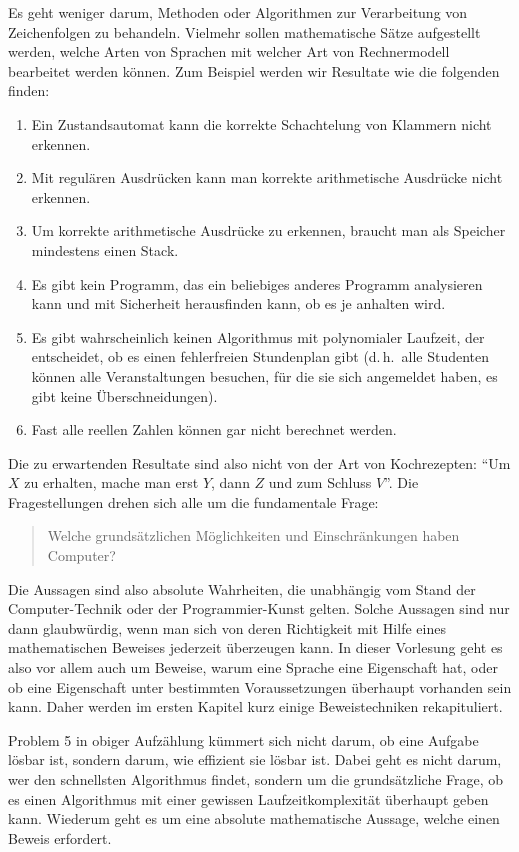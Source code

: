 Es geht weniger darum, Methoden oder Algorithmen zur Verarbeitung
von Zeichenfolgen zu behandeln.
Vielmehr sollen mathematische Sätze aufgestellt werden, welche
Arten von Sprachen mit welcher Art von Rechnermodell bearbeitet
werden können.
Zum Beispiel werden wir Resultate wie die folgenden finden:
\begin{enumerate}
\item Ein Zustandsautomat kann die korrekte Schachtelung von
Klammern nicht erkennen.
\item Mit regulären Ausdrücken kann man korrekte arithmetische
Ausdrücke nicht erkennen.
\item Um korrekte arithmetische Ausdrücke zu erkennen, braucht man als
Speicher mindestens einen Stack.
\item Es gibt kein Programm, das ein beliebiges anderes Programm
analysieren kann und mit Sicherheit herausfinden kann, ob es je anhalten
wird.
\item Es gibt wahrscheinlich keinen Algorithmus mit polynomialer Laufzeit,
der entscheidet, ob es einen fehlerfreien Stundenplan gibt (d.\,h.~alle 
Studenten können alle Veranstaltungen besuchen, für die sie sich
angemeldet haben, es gibt keine Überschneidungen).
\item Fast alle reellen Zahlen können gar nicht berechnet werden.
\end{enumerate}
Die zu erwartenden Resultate sind also nicht von der Art von Kochrezepten:
``Um $X$ zu erhalten, mache man erst $Y$, dann $Z$ und zum Schluss $V$''.
Die Fragestellungen drehen sich alle um die fundamentale Frage:
\begin{quote}
Welche grundsätzlichen Möglichkeiten und Einschränkungen haben
Computer?
\end{quote}
Die Aussagen sind also absolute Wahrheiten, die unabhängig vom Stand
der Com\-pu\-ter-Technik oder der Programmier-Kunst gelten.
Solche Aussagen sind nur dann glaub\-würdig, wenn man sich von deren
Richtigkeit mit Hilfe eines mathematischen Beweises jederzeit überzeugen
kann. In dieser Vorlesung geht es also vor allem auch um Beweise, 
warum eine Sprache eine Eigenschaft hat, oder ob eine Eigenschaft
unter bestimmten Voraussetzungen überhaupt vorhanden sein kann.
Daher werden im ersten Kapitel kurz einige Beweistechniken rekapituliert.

Problem 5 in obiger Aufzählung kümmert sich nicht darum, ob eine
Aufgabe lösbar ist, sondern darum, wie effizient sie lösbar ist.
Dabei geht es nicht darum, wer den schnellsten Algorithmus findet,
sondern um die grundsätzliche Frage, ob es einen Algorithmus mit
einer gewissen Laufzeitkomplexität überhaupt geben kann.
Wiederum geht es um eine absolute mathematische Aussage, welche
einen Beweis erfordert. 

